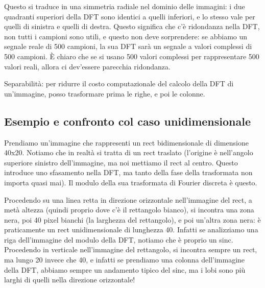 \documentclass[a4paper,11pt]{article}
\begin{document}
Questo si traduce in una simmetria radiale nel dominio delle immagini: i due quadranti superiori della DFT sono identici a quelli inferiori,
e lo stesso vale per quelli di sinistra e quelli di destra. Questo significa che c'è ridondanza nella DFT, non tutti i campioni sono utili, e questo
non deve sorprendere: se abbiamo un segnale reale di 500 campioni, la sua DFT sarà un segnale a valori complessi di 500 campioni. È chiaro che se si usano
500 valori complessi per rappresentare 500 valori reali, allora ci dev'essere parecchia ridondanza.
\par
Separabilità: per ridurre il costo computazionale del calcolo della DFT di un'immagine, posso trasformare prima le righe, e poi le colonne.

\subsection{Esempio e confronto col caso unidimensionale}
Prendiamo un'immagine che rappresenti un rect bidimensionale di dimensione 40x20. Notiamo che in realtà si tratta di un rect traslato (l'origine è
nell'angolo superiore
sinistro dell'immagine, ma noi mettiamo il rect al centro. Questo introduce uno sfasamento nella DFT, ma tanto della fase della trasformata
non importa quasi mai). Il modulo della sua trasformata di Fourier discreta è questo.

\par
Procedendo su una linea retta in direzione orizzontale nell'immagine del rect, a metà altezza (quindi proprio dove c'è il rettangolo bianco), si incontra una
zona nera, poi 40 pixel bianchi (la larghezza del rettangolo), e poi un'altra zona nera: è praticamente un rect unidimensionale di lunghezza 40. Infatti
se analizziamo una riga dell'immagine del modulo della DFT, notiamo che è proprio un sinc.
Procedendo in verticale nell'immagine del rettangolo, si incontra sempre un rect, ma lungo 20 invece che 40, e infatti se prendiamo una
colonna dell'immagine della DFT, abbiamo sempre un andamento tipico del sinc, ma i lobi sono più larghi di quelli nella direzione orizzontale!
\end{document}
